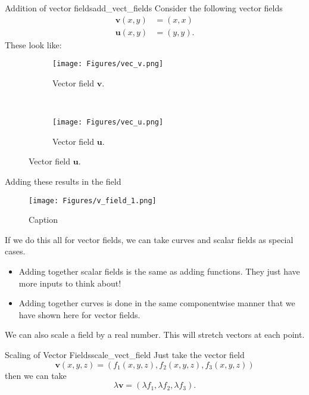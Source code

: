         \begin{ex}{Addition of vector fields}{add_vect_fields}
        Consider the following vector fields
        \begin{align*}
            \mathbf{v}(x,y)&=(x,x)\\
            \mathbf{u}(x,y)&=(y,y).
        \end{align*}
        These look like:
        \begin{figure}[H]
            \centering
            \begin{subfigure}[h]{.45\textwidth}
            \texttt{[image: Figures/vec\_v.png]}
            \caption{Vector field $\mathbf{v}$.}
            \end{subfigure}
            ~
            \begin{subfigure}[h]{.45\textwidth}
            \texttt{[image: Figures/vec\_u.png]}
            \caption{Vector field $\mathbf{u}$.}
            \end{subfigure}
        \end{figure}
        Adding these results in the field
        \begin{figure}[H]
            \centering
            \texttt{[image: Figures/v\_field\_1.png]}
            \caption{Caption}
            \label{fig:vec_field_1}
        \end{figure}
        \end{ex}
%        
        \begin{remark}
        If we do this all for vector fields, we can take curves and scalar fields as special cases.
        \begin{itemize}
            \item Adding together scalar fields is the same as adding functions.  They just have more inputs to think about!
            \item Adding together curves is done in the same componentwise manner that we have shown here for vector fields.
        \end{itemize}
        \end{remark}
        
        We can also scale a field by a real number.  This will stretch vectors at each point.
        
        \begin{ex}{Scaling of Vector Fields}{scale_vect_field}
        Just take the vector field
        \[
        \mathbf{v}(x,y,z)=(f_1(x,y,z),f_2(x,y,z),f_3(x,y,z))
        \]
        then we can take
        \[
        \lambda \mathbf{v}=(\lambda f_1, \lambda f_2, \lambda f_3).
        \]
        \end{ex}
        
